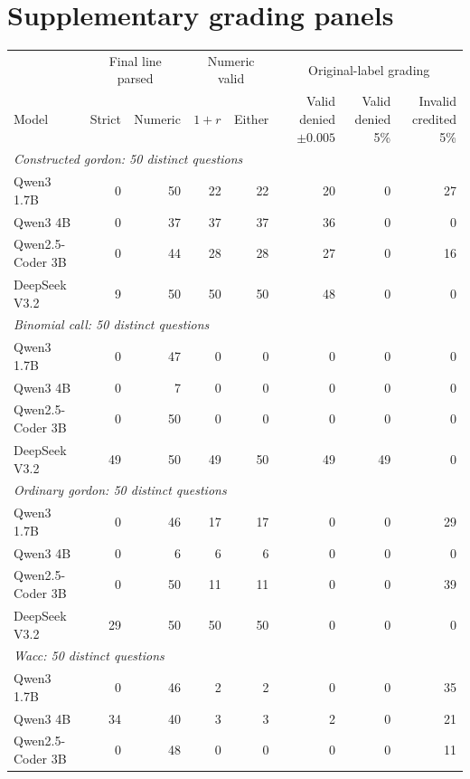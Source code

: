 \section{Supplementary grading panels}\label{app:grading-panels}
\begin{table}[!ht]
\centering\footnotesize
\begin{tabular}{lrrrrrrr}
\toprule
 & \multicolumn{2}{c}{Final line parsed} & \multicolumn{2}{c}{Numeric valid} & \multicolumn{3}{c}{Original-label grading}\\
Model & Strict & Numeric & $1+r$ & Either & \shortstack{Valid denied\\$\pm0.005$} &
\shortstack{Valid denied\\5\%} & \shortstack{Invalid credited\\5\%}\\
\midrule
\multicolumn{8}{l}{\emph{Constructed gordon: 50 distinct questions}}\\
Qwen3 1.7B & 0 & 50 & 22 & 22 & 20 & 0 & 27\\
Qwen3 4B & 0 & 37 & 37 & 37 & 36 & 0 & 0\\
Qwen2.5-Coder 3B & 0 & 44 & 28 & 28 & 27 & 0 & 16\\
DeepSeek V3.2 & 9 & 50 & 50 & 50 & 48 & 0 & 0\\
\multicolumn{8}{l}{\emph{Binomial call: 50 distinct questions}}\\
Qwen3 1.7B & 0 & 47 & 0 & 0 & 0 & 0 & 0\\
Qwen3 4B & 0 & 7 & 0 & 0 & 0 & 0 & 0\\
Qwen2.5-Coder 3B & 0 & 50 & 0 & 0 & 0 & 0 & 0\\
DeepSeek V3.2 & 49 & 50 & 49 & 50 & 49 & 49 & 0\\
\multicolumn{8}{l}{\emph{Ordinary gordon: 50 distinct questions}}\\
Qwen3 1.7B & 0 & 46 & 17 & 17 & 0 & 0 & 29\\
Qwen3 4B & 0 & 6 & 6 & 6 & 0 & 0 & 0\\
Qwen2.5-Coder 3B & 0 & 50 & 11 & 11 & 0 & 0 & 39\\
DeepSeek V3.2 & 29 & 50 & 50 & 50 & 0 & 0 & 0\\
\multicolumn{8}{l}{\emph{Wacc: 50 distinct questions}}\\
Qwen3 1.7B & 0 & 46 & 2 & 2 & 0 & 0 & 35\\
Qwen3 4B & 34 & 40 & 3 & 3 & 2 & 0 & 21\\
Qwen2.5-Coder 3B & 0 & 48 & 0 & 0 & 0 & 0 & 11\\

\end{tabular}
\end{table}

